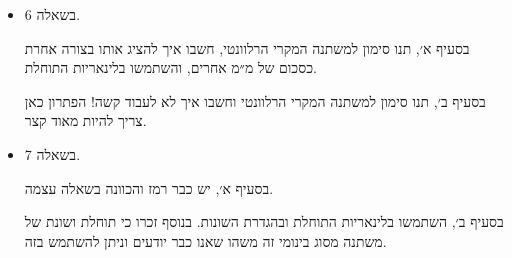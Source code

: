 \documentclass[12pt, a4paper]{article}
\begin{document}
\begin{enumerate}
\begin{itemize}
שימוש ישיר בהגדרות, לאט לאט.
\item
בשאלה 6.

בסעיף א׳, תנו סימון למשתנה המקרי הרלוונטי, חשבו איך להציג אותו בצורה אחרת כסכום של מ״מ אחרים, והשתמשו בלינאריות התוחלת.

בסעיף ב׳, תנו סימון למשתנה המקרי הרלוונטי וחשבו איך לא לעבוד קשה! הפתרון כאן צריך להיות מאוד קצר.

\item
בשאלה 7.

בסעיף א׳, יש כבר רמז והכוונה בשאלה עצמה.

בסעיף ב׳, השתמשו בלינאריות התוחלת ובהגדרת השונות. בנוסף זכרו כי תוחלת ושונת של משתנה מסוג בינומי זה משהו שאנו כבר יודעים וניתן להשתמש בזה.
\end{itemize}
\end{enumerate}
\end{document}
